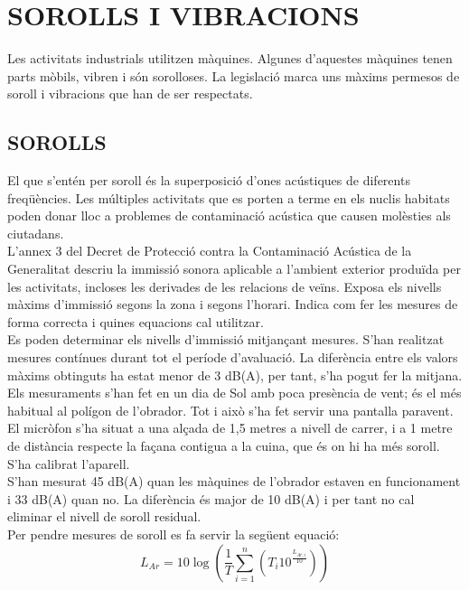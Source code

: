 \chapter{\uppercase{Sorolls i vibracions}}
Les activitats industrials utilitzen màquines. Algunes d'aquestes màquines tenen parts mòbils, vibren i són sorolloses. La legislació marca uns màxims permesos de soroll i vibracions que han de ser respectats.
\section{\uppercase{Sorolls}}
El que s'entén per soroll és la superposició d'ones acústiques de diferents freqüències. Les múltiples activitats que es porten a terme en els nuclis habitats poden donar lloc a problemes de contaminació acústica que causen molèsties als ciutadans.\\
\newline L'annex 3 del Decret de Protecció contra la Contaminació Acústica de la Generalitat descriu la immissió sonora aplicable a l'ambient exterior produïda per les activitats, incloses les derivades de les relacions de veïns. Exposa els nivells màxims d'immissió segons la zona i segons l'horari. Indica com fer les mesures de forma correcta i quines equacions cal utilitzar.\\
\newline Es poden determinar els nivells d'immissió mitjançant mesures. S'han realitzat mesures contínues durant tot el període d'avaluació. La diferència entre els valors màxims obtinguts ha estat menor de 3 dB(A), per tant, s'ha pogut fer la mitjana.\\
\newline Els mesuraments s'han fet en un dia de Sol amb poca presència de vent; és el més habitual al polígon de l'obrador. Tot i això s'ha fet servir una pantalla paravent. El micròfon s'ha situat a una alçada de 1,5 metres a nivell de carrer, i a 1 metre de distància respecte la façana contigua a la cuina, que és on hi ha més soroll. S'ha calibrat l'aparell.\\
\newline S'han mesurat 45 dB(A) quan les màquines de l'obrador estaven en funcionament i 33 dB(A) quan no. La diferència és major de 10 dB(A) i per tant no cal eliminar el nivell de soroll residual.\\
\newline Per pendre mesures de soroll es fa servir la següent equació:
\begin{equation}
L_{Ar}= 10 \log\left ( \frac{1}{T} \sum_{i=1}^{n} \left ( T_{i}10^{\frac{L_{Ar,i}}{10}} \right ) \right )
\end{equation}
